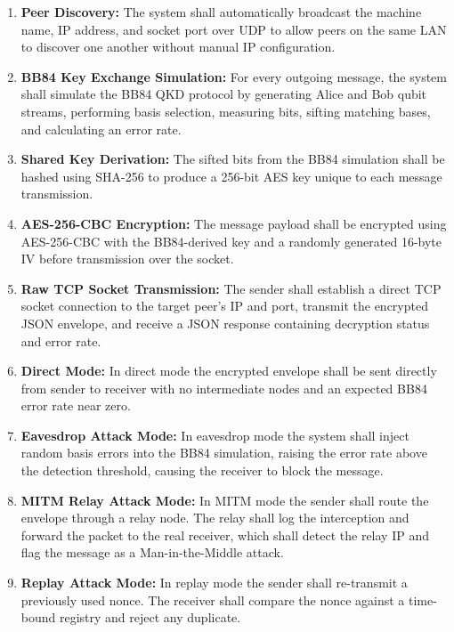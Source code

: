 \begin{enumerate}
    \item \textbf{Peer Discovery:} The system shall automatically broadcast the machine name, IP address, and socket port over UDP to allow peers on the same LAN to discover one another without manual IP configuration.

    \item \textbf{BB84 Key Exchange Simulation:} For every outgoing message, the system shall simulate the BB84 QKD protocol by generating Alice and Bob qubit streams, performing basis selection, measuring bits, sifting matching bases, and calculating an error rate.

    \item \textbf{Shared Key Derivation:} The sifted bits from the BB84 simulation shall be hashed using SHA-256 to produce a 256-bit AES key unique to each message transmission.

    \item \textbf{AES-256-CBC Encryption:} The message payload shall be encrypted using AES-256-CBC with the BB84-derived key and a randomly generated 16-byte IV before transmission over the socket.

    \item \textbf{Raw TCP Socket Transmission:} The sender shall establish a direct TCP socket connection to the target peer's IP and port, transmit the encrypted JSON envelope, and receive a JSON response containing decryption status and error rate.

    \item \textbf{Direct Mode:} In direct mode the encrypted envelope shall be sent directly from sender to receiver with no intermediate nodes and an expected BB84 error rate near zero.

    \item \textbf{Eavesdrop Attack Mode:} In eavesdrop mode the system shall inject random basis errors into the BB84 simulation, raising the error rate above the detection threshold, causing the receiver to block the message.

    \item \textbf{MITM Relay Attack Mode:} In MITM mode the sender shall route the envelope through a relay node. The relay shall log the interception and forward the packet to the real receiver, which shall detect the relay IP and flag the message as a Man-in-the-Middle attack.

    \item \textbf{Replay Attack Mode:} In replay mode the sender shall re-transmit a previously used nonce. The receiver shall compare the nonce against a time-bound registry and reject any duplicate.


\end{enumerate}
